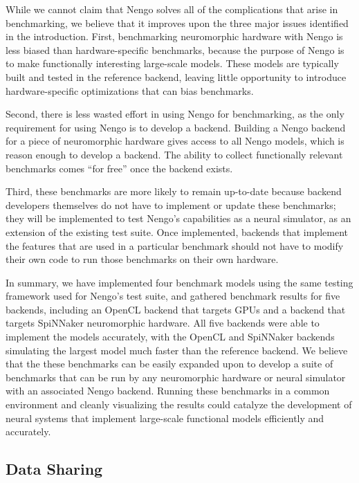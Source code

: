\documentclass{frontiersSCNS}
\begin{document}
While we cannot claim that Nengo
solves all of the complications that arise
in benchmarking,
we believe that it improves upon
the three major issues identified in the introduction.
First, benchmarking neuromorphic hardware
with Nengo is less biased than
hardware-specific benchmarks,
because the purpose of Nengo is
to make functionally interesting large-scale models.
These models are typically built and tested
in the reference backend,
leaving little opportunity to introduce
hardware-specific optimizations
that can bias benchmarks.

Second, there is less wasted effort
in using Nengo for benchmarking,
as the only requirement for using
Nengo is to develop a backend.
Building a Nengo backend for
a piece of neuromorphic hardware
gives access to all Nengo models,
which is reason enough to develop a backend.
The ability to collect functionally relevant benchmarks
comes ``for free'' once the backend exists.

Third, these benchmarks are more likely to
remain up-to-date because backend developers
themselves do not have to implement or update
these benchmarks;
they will be implemented to test Nengo's
capabilities as a neural simulator,
as an extension of the existing test suite.
Once implemented, backends that implement
the features that are used in a particular benchmark
should not have to modify their own code
to run those benchmarks on their own hardware.

In summary, we have implemented
four benchmark models using the same
testing framework used for Nengo's test suite,
and gathered benchmark results
for five backends,
including an OpenCL backend that targets GPUs
and a backend that targets
SpiNNaker neuromorphic hardware.
All five backends were able to implement
the models accurately,
with the OpenCL and SpiNNaker backends
simulating the largest model much faster
than the reference backend.
We believe that the these benchmarks
can be easily expanded upon
to develop a suite of benchmarks
that can be run by any neuromorphic hardware
or neural simulator
with an associated Nengo backend.
Running these benchmarks in a common environment
and cleanly visualizing the results
could catalyze the development of
neural systems that implement
large-scale functional models
efficiently and accurately.

\subsection{Data Sharing}
\end{document}
